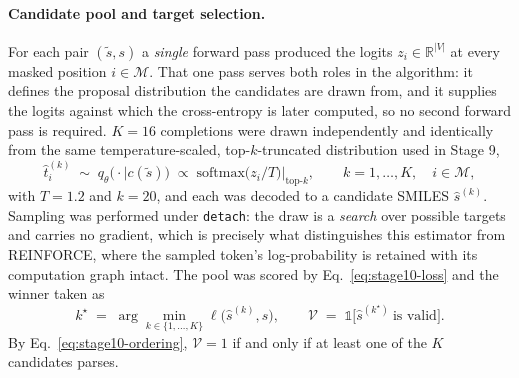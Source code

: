 \paragraph{Candidate pool and target selection.}
For each pair $(\tilde{s}, s)$ a \emph{single} forward pass produced the logits
$z_i \in \mathbb{R}^{|V|}$ at every masked position $i \in \mathcal{M}$. That
one pass serves both roles in the algorithm: it defines the proposal
distribution the candidates are drawn from, and it supplies the logits against
which the cross-entropy is later computed, so no second forward pass is
required. $K=16$ completions were drawn independently and identically from the
same temperature-scaled, top-$k$-truncated distribution used in Stage 9,
\begin{equation}
\hat{t}^{(k)}_i \;\sim\; q_{\theta}\bigl(\cdot \mid c(\tilde{s})\bigr)
\;\propto\; \mathrm{softmax}\bigl(z_i / T\bigr)\Big|_{\mathrm{top}\text{-}k},
\qquad k = 1,\dots,K, \quad i \in \mathcal{M},
\label{eq:stage10-sampling}
\end{equation}
with $T=1.2$ and $k=20$, and each was decoded to a candidate SMILES
$\hat{s}^{(k)}$. Sampling was performed under \texttt{detach}: the draw is a
\emph{search} over possible targets and carries no gradient, which is precisely
what distinguishes this estimator from REINFORCE, where the sampled token's
log-probability is retained with its computation graph intact. The pool was
scored by Eq.~\eqref{eq:stage10-loss} and the winner taken as
\begin{equation}
k^{\star} \;=\; \arg\min_{k \in \{1,\dots,K\}} \ell\bigl(\hat{s}^{(k)}, s\bigr),
\qquad
\mathcal{V} \;=\; \mathbb{1}\bigl[\hat{s}^{(k^{\star})}\ \text{is valid}\bigr].
\label{eq:stage10-argmin}
\end{equation}
By Eq.~\eqref{eq:stage10-ordering}, $\mathcal{V}=1$ if and only if at least one
of the $K$ candidates parses.

